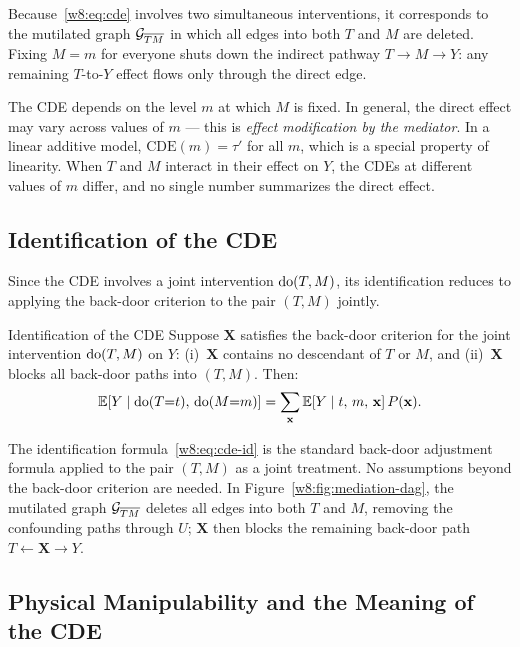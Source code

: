 \documentclass[master.tex]{subfiles}
\begin{document}
Because~\eqref{w8:eq:cde} involves two simultaneous interventions, it
corresponds to the mutilated graph $\mathcal{G}_{\overline{TM}}$ in which all
edges into both $T$ and $M$ are deleted.  Fixing $M = m$ for everyone
shuts down the indirect pathway $T \to M \to Y$: any remaining
$T$-to-$Y$ effect flows only through the direct edge.

\begin{remark}
The CDE depends on the level $m$ at which $M$ is fixed.  In general,
the direct effect may vary across values of $m$ --- this is
\emph{effect modification by the mediator}.  In a linear additive
model, $\mathrm{CDE}(m) = \tau'$ for all $m$, which is a special
property of linearity.  When $T$ and $M$ interact in their effect on
$Y$, the CDEs at different values of $m$ differ, and no single number
summarizes the direct effect.
\end{remark}

\subsection{Identification of the CDE}

Since the CDE involves a joint intervention $\mathrm{do}(T, M)$, its
identification reduces to applying the back-door criterion to the pair
$(T, M)$ jointly.

\begin{thm}{Identification of the CDE}
\label{w8:thm:cde}
Suppose $\mathbf{X}$ satisfies the back-door criterion for the joint
intervention $\mathrm{do}(T, M)$ on $Y$: (i)~$\mathbf{X}$ contains no
descendant of $T$ or $M$, and (ii)~$\mathbf{X}$ blocks all back-door
paths into $(T, M)$.  Then:
\begin{equation}
  \mathbb{E}[Y \mid \mathrm{do}(T{=}t),\, \mathrm{do}(M{=}m)]
  = \sum_{\mathbf{x}} \mathbb{E}[Y \mid t,\, m,\, \mathbf{x}]\, P(\mathbf{x}).
  \label{w8:eq:cde-id}
\end{equation}
\end{thm}

The identification formula~\eqref{w8:eq:cde-id} is the standard
back-door adjustment formula applied to the pair $(T, M)$ as a joint
treatment.  No assumptions beyond the back-door criterion are needed.
In Figure~\ref{w8:fig:mediation-dag}, the mutilated graph
$\mathcal{G}_{\overline{TM}}$ deletes all edges into both $T$ and $M$,
removing the confounding paths through $U$; $\mathbf{X}$ then blocks
the remaining back-door path $T \leftarrow \mathbf{X} \to Y$.

\subsection{Physical Manipulability and the Meaning of the CDE}
\end{document}
